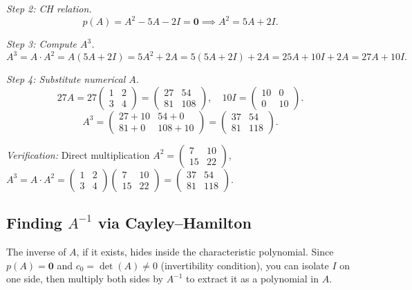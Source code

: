 \documentclass[12pt,a4paper]{article}
\begin{document}
\textit{Step 2: CH relation.}
\[
  p(A) = A^2 - 5A - 2I = \mathbf{0} \implies A^2 = 5A + 2I.
\]

\textit{Step 3: Compute \(A^3\).}
\[
  A^3 = A \cdot A^2 = A(5A + 2I) = 5A^2 + 2A = 5(5A + 2I) + 2A = 25A + 10I + 2A = 27A + 10I.
\]

\textit{Step 4: Substitute numerical \(A\).}
\[
  27A = 27\begin{pmatrix}1&2\\3&4\end{pmatrix} = \begin{pmatrix}27&54\\81&108\end{pmatrix}, \quad
  10I = \begin{pmatrix}10&0\\0&10\end{pmatrix}.
\]
\[
  A^3 = \begin{pmatrix}27+10 & 54+0 \\ 81+0 & 108+10\end{pmatrix} = \begin{pmatrix}37 & 54 \\ 81 & 118\end{pmatrix}.
\]

\textit{Verification:} Direct multiplication \(A^2 = \begin{pmatrix}7&10\\15&22\end{pmatrix}\),
\(A^3 = A \cdot A^2 = \begin{pmatrix}1&2\\3&4\end{pmatrix}\begin{pmatrix}7&10\\15&22\end{pmatrix}
= \begin{pmatrix}37&54\\81&118\end{pmatrix}\). \checkmark

\subsection{Finding \texorpdfstring{\(A^{-1}\)}{A-inverse} via Cayley--Hamilton}

The inverse of \(A\), if it exists, hides inside the characteristic polynomial. Since \(p(A) = \mathbf{0}\) and \(c_0 = \det(A) \neq 0\) (invertibility condition), you can isolate \(I\) on one side, then multiply both sides by \(A^{-1}\) to extract it as a polynomial in \(A\).
\end{document}
